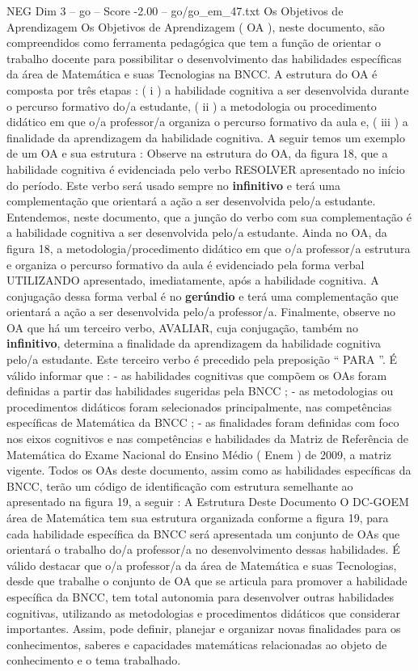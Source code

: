 \begin{textsample}{NEG Dim 3 – go – Score -2.00 – go/go\_em\_47.txt}  \label{ex:f3_neg_244}
Os Objetivos de Aprendizagem Os Objetivos de Aprendizagem ( OA ), neste documento, são compreendidos como ferramenta pedagógica que tem a função de orientar o trabalho docente para possibilitar o desenvolvimento das habilidades específicas da área de Matemática e suas Tecnologias na BNCC.
A estrutura do OA é composta por três etapas : ( i ) a habilidade cognitiva a ser desenvolvida durante o percurso formativo do/a estudante, ( ii ) a metodologia ou procedimento didático em que o/a professor/a organiza o percurso formativo da aula e, ( iii ) a finalidade da aprendizagem da habilidade cognitiva.
A seguir temos um exemplo de um OA e sua estrutura : Observe na estrutura do OA, da figura 18, que a habilidade cognitiva é evidenciada pelo verbo RESOLVER apresentado no início do período.
Este verbo será usado sempre no \textbf{infinitivo} e terá uma complementação que orientará a ação a ser desenvolvida pelo/a estudante.
Entendemos, neste documento, que a junção do verbo com sua complementação é a habilidade cognitiva a ser desenvolvida pelo/a estudante.
Ainda no OA, da figura 18, a metodologia/procedimento didático em que o/a professor/a estrutura e organiza o percurso formativo da aula é evidenciado pela forma verbal UTILIZANDO apresentado, imediatamente, após a habilidade cognitiva.
A conjugação dessa forma verbal é no \textbf{gerúndio} e terá uma complementação que orientará a ação a ser desenvolvida pelo/a professor/a.
Finalmente, observe no OA que há um terceiro verbo, AVALIAR, cuja conjugação, também no \textbf{infinitivo}, determina a finalidade da aprendizagem da habilidade cognitiva pelo/a estudante.
Este terceiro verbo é precedido pela preposição “ PARA ”.
É válido informar que : - as habilidades cognitivas que compõem os OAs foram definidas a partir das habilidades sugeridas pela BNCC ; - as metodologias ou procedimentos didáticos foram selecionados principalmente, nas competências específicas de Matemática da BNCC ; - as finalidades foram definidas com foco nos eixos cognitivos e nas competências e habilidades da Matriz de Referência de Matemática do Exame Nacional do Ensino Médio ( Enem ) de 2009, a matriz vigente.
Todos os OAs deste documento, assim como as habilidades específicas da BNCC, terão um código de identificação com estrutura semelhante ao apresentado na figura 19, a seguir : A Estrutura Deste Documento O DC-GOEM área de Matemática tem sua estrutura organizada conforme a figura 19, para cada habilidade específica da BNCC será apresentada um conjunto de OAs que orientará o trabalho do/a professor/a no desenvolvimento dessas habilidades.
É válido destacar que o/a professor/a da área de Matemática e suas Tecnologias, desde que trabalhe o conjunto de OA que se articula para promover a habilidade específica da BNCC, tem total autonomia para desenvolver outras habilidades cognitivas, utilizando as metodologias e procedimentos didáticos que considerar importantes.
Assim, pode definir, planejar e organizar novas finalidades para os conhecimentos, saberes e capacidades matemáticas relacionadas ao objeto de conhecimento e o tema trabalhado.

\end{textsample}
